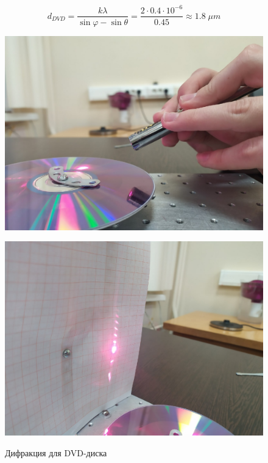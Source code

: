 \documentclass[titlepage, a4paper,12pt]{article}
\begin{document}
	$$ d_{DVD} = \frac{k \lambda}{\sin\varphi - \sin\theta} = \frac{2 \cdot 0.4 \cdot 10^{-6}}{0.45} \approx 1.8 \; \mu m $$
	
	\begin{figure}[h!]
		\begin{center}
			\begin{minipage}[h]{0.49\linewidth}
				\includegraphics[width=1\linewidth]{4_1}
				\label{ris:4.1} %
			\end{minipage}
		\hfill
			\begin{minipage}[h]{0.49\linewidth}
				\includegraphics[width=1\linewidth]{4_2}
				\label{ris:4.2}
			\end{minipage}
			\caption{Дифракция для DVD-диска}
		\end{center}
	\end{figure}
	
\end{document}
